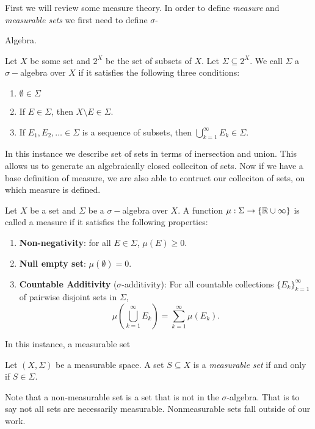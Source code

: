 First we will review some measure theory.  In order to define \textit{measure} and \textit{measurable sets} we first need to define $\sigma$\hyphen{Algebra.   



\begin{definition}
    Let $X$ be some set and $2^X$ be the set of subsets of $X$. Let $\Sigma \subseteq 2^X$. We call $\Sigma$ a $\sigma-$algebra over $X$ if it satisfies the following three conditions:
    \begin{enumerate}
        \item $\emptyset \in \Sigma$
        \item If $E \in \Sigma$, then $X\setminus E \in \Sigma$. 
        \item If $E_1, E_2, \dots \in \Sigma$ is a sequence of subsets, then $\bigcup_{k=1}^\infty E_k \in \Sigma$. 
    \end{enumerate}
\end{definition}

In this instance we describe set of sets in terms of inersection and union.  This allows us to generate an algebraically closed colleciton of sets.  Now if we have a base definition of measure, we are also able to contruct our colleciton of sets, on which measure is defined.   

\begin{definition}[Measure]
    Let $X$ be a set and $\Sigma$ be a $\sigma-$algebra over $X$.  A function $\mu: \Sigma \to \{\mathbb{R} \cup \infty\}$ is called a measure if it satisfies the following properties:
    \begin{enumerate}
        \item \textbf{Non-negativity}: for all $E \in \Sigma$, $\mu(E)\geq 0$.
        \item \textbf{Null empty set}: $\mu(\emptyset) = 0$. 
        \item \textbf{Countable Additivity} ($\sigma$-additivity): For all countable collections $\{E_k\}_{k=1}^\infty$ of pairwise disjoint sets in $\Sigma$, $$\mu\left( \bigcup_{k=1}^\infty E_k \right) = \sum_{k=1}^\infty \mu(E_k).$$
    \end{enumerate}
\end{definition}

In this instance, a measurable set 
\begin{definition}
    Let $(X,\Sigma)$ be a measurable space.  A set $S\subseteq X$ is a \textit{measurable set} if and only if $S \in \Sigma$.
\end{definition}
Note that a non-measurable set is a set that is not in the $\sigma$-algebra.  That is to say not all sets are necessarily measurable.  Nonmeasurable sets fall outside of our work.  

}
